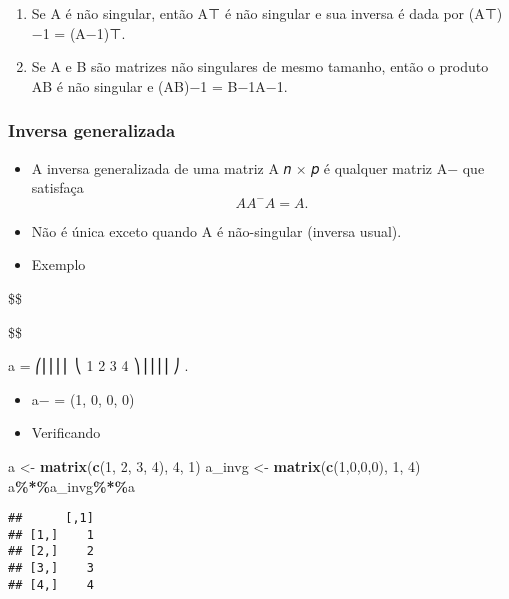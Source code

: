 \documentclass[
]{article}
\newenvironment{Shaded}{\begin{snugshade}}{\end{snugshade}}
\newcommand{\DecValTok}[1]{\textcolor[rgb]{0.00,0.00,0.81}{#1}}
\newcommand{\FunctionTok}[1]{\textcolor[rgb]{0.13,0.29,0.53}{\textbf{#1}}}
\newcommand{\NormalTok}[1]{#1}
\newcommand{\OtherTok}[1]{\textcolor[rgb]{0.56,0.35,0.01}{#1}}
\newcommand{\SpecialCharTok}[1]{\textcolor[rgb]{0.81,0.36,0.00}{\textbf{#1}}}
\providecommand{\tightlist}{%
  \setlength{\itemsep}{0pt}\setlength{\parskip}{0pt}}
\begin{document}
\begin{enumerate}
\def\labelenumi{\arabic{enumi}.}
\tightlist
\item
  Se A é não singular, então A⊤ é não singular e sua inversa é dada por
  (A⊤)−1 = (A−1)⊤.
\item
  Se A e B são matrizes não singulares de mesmo tamanho, então o produto
  AB é não singular e (AB)−1 = B−1A−1.
\end{enumerate}

\hypertarget{inversa-generalizada}{%
\subsubsection{Inversa generalizada}\label{inversa-generalizada}}

\begin{itemize}
\item
  A inversa generalizada de uma matriz A 𝑛 × 𝑝 é qualquer matriz A− que
  satisfaça \[
  AA^{−}A = A.
  \]
\item
  Não é única exceto quando A é não-singular (inversa usual).
\item
  Exemplo
\end{itemize}

\$\$

\$\$

a = ⎛⎜⎜⎜⎜ ⎝ 1 2 3 4 ⎞⎟⎟⎟⎟ ⎠ .

\begin{itemize}
\item
  a− = (1, 0, 0, 0)
\item
  Verificando
\end{itemize}

\begin{Shaded}
\begin{Highlighting}[]
\NormalTok{a }\OtherTok{\textless{}{-}} \FunctionTok{matrix}\NormalTok{(}\FunctionTok{c}\NormalTok{(}\DecValTok{1}\NormalTok{, }\DecValTok{2}\NormalTok{, }\DecValTok{3}\NormalTok{, }\DecValTok{4}\NormalTok{), }\DecValTok{4}\NormalTok{, }\DecValTok{1}\NormalTok{)}
\NormalTok{a\_invg }\OtherTok{\textless{}{-}} \FunctionTok{matrix}\NormalTok{(}\FunctionTok{c}\NormalTok{(}\DecValTok{1}\NormalTok{,}\DecValTok{0}\NormalTok{,}\DecValTok{0}\NormalTok{,}\DecValTok{0}\NormalTok{), }\DecValTok{1}\NormalTok{, }\DecValTok{4}\NormalTok{)}
\NormalTok{a}\SpecialCharTok{\%*\%}\NormalTok{a\_invg}\SpecialCharTok{\%*\%}\NormalTok{a}
\end{Highlighting}
\end{Shaded}

\begin{verbatim}
##      [,1]
## [1,]    1
## [2,]    2
## [3,]    3
## [4,]    4
\end{verbatim}
\end{document}
